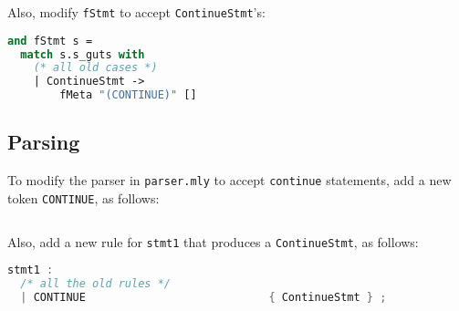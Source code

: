 \documentclass[a4paper,10pt]{article}
\begin{document}
Also, modify \texttt{fStmt} to accept \texttt{ContinueStmt}'s:

\begin{lstlisting}[language=ml]
and fStmt s = 
  match s.s_guts with
    (* all old cases *)
    | ContinueStmt ->
        fMeta "(CONTINUE)" []
\end{lstlisting}

\subsection{Parsing}

To modify the parser in \texttt{parser.mly} to accept \texttt{continue} statements, add a new token \texttt{CONTINUE}, as follows:

\begin{lstlisting}[language=c]
%token                  CONTINUE
\end{lstlisting}

Also, add a new rule for \texttt{stmt1} that produces a \texttt{ContinueStmt}, as follows:

\begin{lstlisting}[language=c]
stmt1 :
  /* all the old rules */
  | CONTINUE                            { ContinueStmt } ;
\end{lstlisting}
\end{document}
